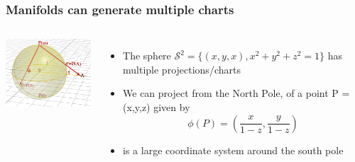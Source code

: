 \documentclass[10pt]{beamer}
\begin{document}
\begin{frame}
  \frametitle{Manifolds can generate multiple charts}
  \begin{columns}
    \column{5cm}
    \includegraphics[width=4.5cm]{manifold_sphere}
    \column{7cm}
    \begin{itemize}
    \item The sphere $\mathcal{S}^2 = \{(x,y,x), x^2+y^2+z^2 = 1 \}$
      has multiple projections/charts
    \item We can project from the North Pole, of a point P = (x,y,z)
      given by
      \[ \phi(P) = \left( \frac{x}{1-z},\frac{y}{1-z} \right) \]
    \item is a large coordinate system around the south pole
    \end{itemize}
  \end{columns}
\end{frame}
\end{document}
